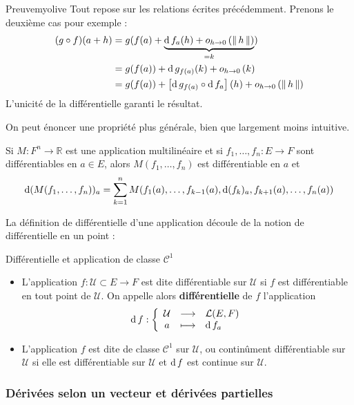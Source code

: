     \begin{demo}{Preuve}{myolive}
        Tout repose sur les relations écrites précédemment. Prenons le deuxième cas pour exemple : 
        \begin{align*}
            (g \circ f)(a + h) 
            &= g(f(a) + \underbrace{\operatorname{d} f_a(h) + o_{h \rightarrow 0} \left(\left\lVert\,h\,\right\rVert\right)}_{=k}) \\
            &= g(f(a)) + \operatorname{d} g_{f(a)}(k) + o_{h \rightarrow 0} \left(k\right) \\
            &= g(f(a)) + \left[\operatorname{d} g_{f(a)} \circ \operatorname{d} f_a\right](h) + o_{h \rightarrow 0} \left(\left\lVert\,h\,\right\rVert\right)
        \end{align*}
        L’unicité de la différentielle garanti le résultat.
    \end{demo}

    On peut énoncer une propriété plus générale, bien que largement moins intuitive.

    \begin{prop}{}{}
        Si $M : F^n \to \mathbb{R}$ est une application multilinéaire et si $f_1,\ldots,f_n : E \to F$ sont différentiables en $a \in E$, alors $M(f_1,\ldots,f_n)$ est différentiable en $a$ et 
        \[ \operatorname{d} (M(f_1,\ldots,f_n))_a = \sum_{k=1}^{n} M(f_1(a), \ldots, f_{k-1}(a), \operatorname{d}(f_k)_a, f_{k+1}(a), \ldots, f_n(a)) \]   
    \end{prop}

    La définition de différentielle d’une application découle de la notion de différentielle en un point : 

    \begin{defi}{Différentielle et application de classe $\mathcal{C}^1$}{}
        \begin{itemize}
            \item L’application $f : \mathcal{U} \subset E \to F$ est dite différentiable sur $\mathcal{U}$ si $f$ est différentiable en tout point de $\mathcal{U}$. On appelle alors \textbf{différentielle} de $f$ l’application 
            \[ \fonction{\dif f}{\mathcal{U}}{\mathcal{L}(E,F)}{a}{\dif f_a} \]
            \item L’application $f$ est dite de classe $\mathcal{C}^1$ sur $\mathcal{U}$, ou continûment différentiable sur $\mathcal{U}$ si elle est différentiable sur $\mathcal{U}$ et $\operatorname{d} f$ est continue sur $\mathcal{U}$. 
        \end{itemize}
    \end{defi}

    \subsubsection{Dérivées selon un vecteur et dérivées partielles}

